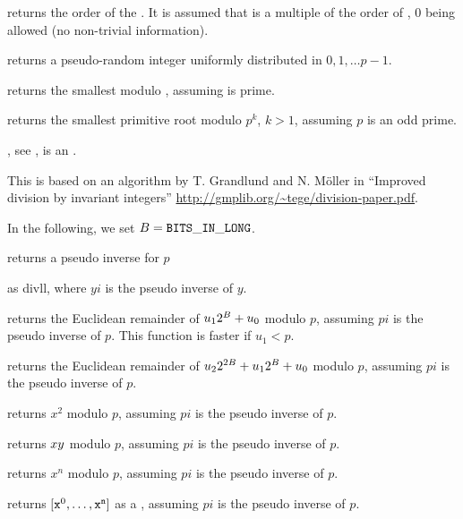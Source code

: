  returns the order of the
 . It is assumed that  is a multiple of the order of
, $0$ being allowed (no non-trivial information).

 returns a pseudo-random integer uniformly
distributed in $0, 1, \dots p-1$.

 returns the smallest 
modulo , assuming  is prime.

 returns the smallest primitive root modulo
$p^k$, $k > 1$, assuming $p$ is an odd prime.

, see ,
 is an .


This is based on an algorithm by T. Grandlund and N. M\"{o}ller in
``Improved division by invariant integers''
\url{http://gmplib.org/~tege/division-paper.pdf}.

In the following, we set $B={\tt BITS\_IN\_LONG}$.

 returns a pseudo inverse  for $p$

as divll, where $yi$ is the pseudo inverse of $y$.

 returns
the Euclidean remainder of $u_1\*2^B+u_0$ modulo $p$, assuming $pi$ is the
pseudo inverse of $p$.  This function is faster if $u_1 < p$.

returns the Euclidean remainder of $u_2\*2^{2\*B}+u_1\*2^{B}+u_0$ modulo $p$,
assuming $pi$ is the pseudo inverse of $p$.

 returns $x^2$ modulo $p$,
assuming $pi$ is the pseudo inverse of $p$.

 returns $x\*y$
modulo $p$, assuming $pi$ is the pseudo inverse of $p$.

 returns
$x^n$ modulo $p$, assuming $pi$ is the pseudo inverse of $p$.

 returns
$[{\tt x}^0, \dots, {\tt x}^{\tt n}]$ as a , assuming $pi$ is the
pseudo inverse of $p$.

